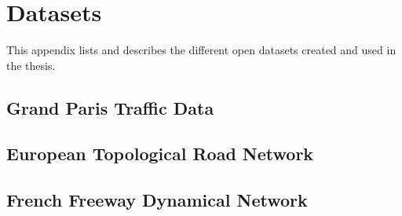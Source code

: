 \chapter{Datasets} %

\label{app:data} %



\headercit{}{}{}



This appendix lists and describes the different open datasets created and used in the thesis.


\section{Grand Paris Traffic Data}

% 


\section{European Topological Road Network}




\section{French Freeway Dynamical Network}





